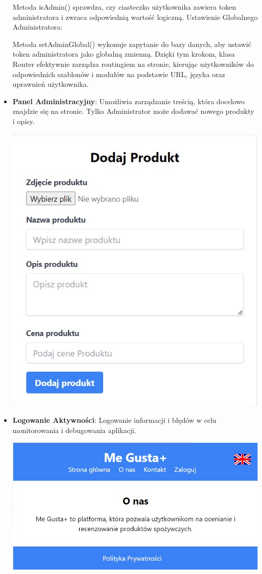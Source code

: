 \documentclass[a4paper,12pt]{report}
\begin{document}
\begin{itemize}
Metoda isAdmin() sprawdza, czy ciasteczko użytkownika zawiera token administratora i zwraca odpowiednią wartość logiczną.
Ustawienie Globalnego Administratora:

Metoda setAdminGlobal() wykonuje zapytanie do bazy danych, aby ustawić token administratora jako globalną zmienną.
Dzięki tym krokom, klasa Router efektywnie zarządza routingiem na stronie, kierując użytkowników do odpowiednich szablonów i modułów na podstawie URL, języka oraz uprawnień użytkownika.

\newpage   

    \item \textbf{Panel Administracyjny}: Umożliwia zarządzanie treścią, która docelowo znajdzie się na stronie. Tylko Administrator może dodawać nowego produkty i opisy.

\includegraphics[width=\textwidth]{02Panel.jpg}

\newpage    
    \item \textbf{Logowanie Aktywności}: Logowanie informacji i błędów w celu monitorowania i debugowania aplikacji.

    \includegraphics[width=\textwidth]{00logo.jpg}


\end{itemize}
\end{document}

